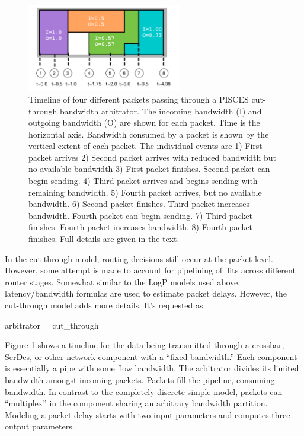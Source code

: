 \begin{figure}
\centering
\includegraphics[width=0.6\textwidth]{figures/pisces}
\caption{Timeline of four different packets passing through a PISCES cut-through bandwidth arbitrator. The incoming bandwidth (I) and outgoing bandwidth (O) are shown for each packet.  Time is the horizontal axis. Bandwidth consumed by a packet is shown by the vertical extent of each packet. The individual events are 1) First packet arrives 2) Second packet arrives with reduced bandwidth but no available bandwidth 3) First packet finishes. Second packet can begin sending. 4) Third packet arrives and begins sending with remaining bandwidth. 5) Fourth packet arrives, but no available bandwidth. 6) Second packet finishes. Third packet increases bandwidth. Fourth packet can begin sending. 7) Third packet finishes. Fourth packet increases bandwidth. 8) Fourth packet finishes.
Full details are given in the text.}
\label{fig:pisces}
\end{figure}

In the cut-through model, routing decisions still occur at the packet-level.
However, some attempt is made to account for pipelining of flits across different router stages.
Somewhat similar to the LogP models used above, latency/bandwidth formulas are used to estimate packet delays.
However, the cut-through model adds more details.
It's requested as:

\begin{ViFile}
arbitrator = cut_through
\end{ViFile}
Figure \ref{fig:pisces} shows a timeline for the data being transmitted through a crossbar, SerDes, or other network component with a ``fixed bandwidth.'' 
Each component is essentially a pipe with some flow bandwidth.
The arbitrator divides its limited bandwidth amongst incoming packets.
Packets fill the pipeline, consuming bandwidth.
In contrast to the completely discrete simple model, packets can ``multiplex'' in the component sharing an arbitrary bandwidth partition.
Modeling a packet delay starts with two input parameters and computes three output parameters.

